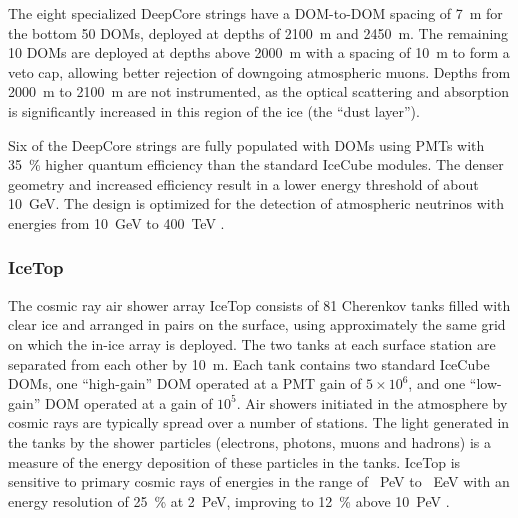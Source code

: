 The eight specialized DeepCore strings have a DOM-to-DOM spacing of
\SI{7}{\meter} for the bottom 50 DOMs, deployed at depths of
\SI{2100}{\meter} and \SI{2450}{\meter}.  The remaining 10 DOMs are
deployed at depths above \SI{2000}{\meter} with a spacing of
\SI{10}{\meter} to form a veto cap, allowing better rejection of downgoing
atmospheric muons.  Depths from \SI{2000}{\meter} to \SI{2100}{\meter}
are not instrumented, as the optical scattering and absorption is
significantly increased in this region of the ice (the ``dust layer'').

Six of the DeepCore strings are fully populated with
DOMs using PMTs with \SI{35}{\%} higher quantum efficiency than the
standard IceCube modules.  The denser geometry and increased efficiency
result in a lower energy threshold of about \SI{10}{\giga\electronvolt}.  The design
is optimized for the detection of atmospheric neutrinos with energies
from \SI{10}{\giga\electronvolt} to \SI{400}{\tera\electronvolt}
\cite{ICECUBE:AtmNu}. 

\subsubsection{IceTop}

The cosmic ray air shower array IceTop \cite{ICECUBE:IceTop} consists of \num{81}
Cherenkov tanks filled with clear ice and arranged in pairs on the
surface, using approximately the same grid on which the in-ice
array is deployed.  The two tanks at each surface station are separated from
each other by \SI{10}{\meter}. Each tank contains two standard IceCube
DOMs, one ``high-gain'' DOM operated at a PMT gain of $5 \times 10^{6}$, and one
``low-gain'' DOM operated at a gain of $10^{5}$. Air showers initiated in the atmosphere by cosmic rays are typically
spread over a number of stations. The light generated in the tanks by the
shower particles (electrons, photons, muons and hadrons) is a measure of
the energy deposition of these particles in the tanks. IceTop is sensitive to
primary cosmic rays of energies in the range of \SI{}{PeV} to \SI{}{EeV}
with an energy resolution of \SI{25}{\%} at \SI{2}{PeV}, improving to
\SI{12}{\%} above \SI{10}{PeV} \cite{IT:measurement}.




